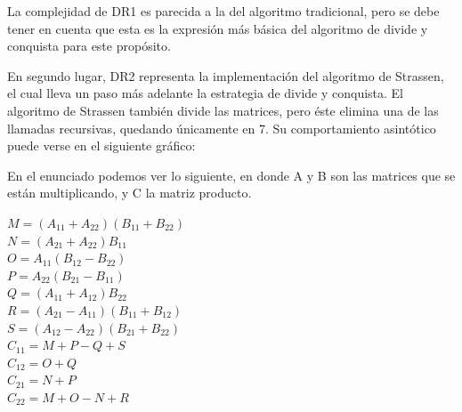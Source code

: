 \documentclass[12pt]{report}
\begin{document}
  La complejidad de DR1 es parecida a la del algoritmo tradicional, pero se debe tener en cuenta que esta es la expresión más básica del algoritmo de divide y conquista para este propósito.

  En segundo lugar, DR2 representa la implementación del algoritmo de Strassen, el cual lleva un paso más adelante la estrategia de divide y conquista. El algoritmo de Strassen también divide las matrices, pero éste elimina una de las llamadas recursivas, quedando únicamente en 7. Su comportamiento asintótico puede verse en el siguiente gráfico:

  \begin{center}
  \end{center}

  En el enunciado podemos ver lo siguiente, en donde A y B son las matrices que se están multiplicando, y C la matriz producto.

  \begin{center}
    $ M = (A_{11} + A_{22})(B_{11} + B_{22}) $ \\
    $ N = (A_{21} + A_{22})B_{11} $ \\
    $ O = A_{11}(B_{12} - B_{22}) $ \\
    $ P = A_{22}(B_{21} - B_{11}) $ \\
    $ Q = (A_{11} + A_{12})B_{22} $ \\
    $ R = (A_{21} - A_{11})(B_{11} + B_{12}) $\\
    $ S = (A_{12} - A_{22})(B_{21} + B_{22}) $ \\
    $ C_{11} = M + P - Q + S $ \\
    $ C_{12} = O + Q $ \\
    $ C_{21} = N + P $ \\
    $ C_{22} = M + O - N + R $
  \end{center}
\end{document}
